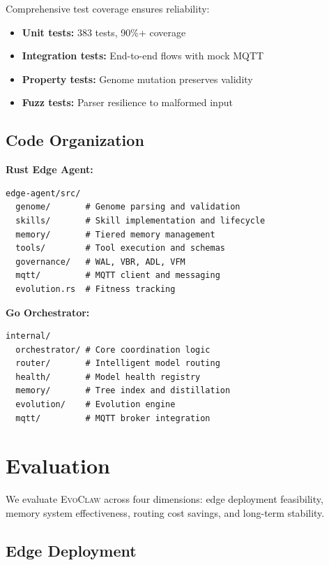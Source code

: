 \documentclass{article}
\newcommand{\evoclaw}{\textsc{EvoClaw}}
\begin{document}
Comprehensive test coverage ensures reliability:

\begin{itemize}[leftmargin=*]
    \item \textbf{Unit tests:} 383 tests, 90\%+ coverage
    \item \textbf{Integration tests:} End-to-end flows with mock MQTT
    \item \textbf{Property tests:} Genome mutation preserves validity
    \item \textbf{Fuzz tests:} Parser resilience to malformed input
\end{itemize}

\subsection{Code Organization}

\textbf{Rust Edge Agent:}
\begin{lstlisting}[basicstyle=\ttfamily\footnotesize]
edge-agent/src/
  genome/       # Genome parsing and validation
  skills/       # Skill implementation and lifecycle
  memory/       # Tiered memory management
  tools/        # Tool execution and schemas
  governance/   # WAL, VBR, ADL, VFM
  mqtt/         # MQTT client and messaging
  evolution.rs  # Fitness tracking
\end{lstlisting}

\textbf{Go Orchestrator:}
\begin{lstlisting}[basicstyle=\ttfamily\footnotesize]
internal/
  orchestrator/ # Core coordination logic
  router/       # Intelligent model routing
  health/       # Model health registry
  memory/       # Tree index and distillation
  evolution/    # Evolution engine
  mqtt/         # MQTT broker integration
\end{lstlisting}



\section{Evaluation}
\label{sec:evaluation}

We evaluate \evoclaw{} across four dimensions: edge deployment feasibility, memory system effectiveness, routing cost savings, and long-term stability.

\subsection{Edge Deployment}
\end{document}
